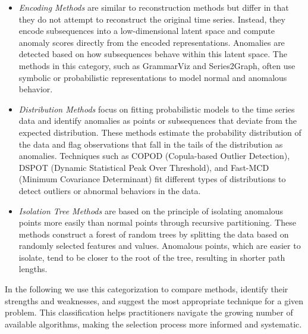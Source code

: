 \begin{itemize}
    \item \textit{Encoding Methods} are similar to reconstruction methods but differ in that they do not attempt to reconstruct the original time series. Instead, they encode subsequences into a low-dimensional latent space and compute anomaly scores directly from the encoded representations. Anomalies are detected based on how subsequences behave within this latent space. The methods in this category, such as GrammarViz and Series2Graph, often use symbolic or probabilistic representations to model normal and anomalous behavior.

    \item \textit{Distribution Methods} focus on fitting probabilistic models to the time series data and identify anomalies as points or subsequences that deviate from the expected distribution. These methods estimate the probability distribution of the data and flag observations that fall in the tails of the distribution as anomalies. Techniques such as COPOD (Copula-based Outlier Detection), DSPOT (Dynamic Statistical Peak Over Threshold), and Fast-MCD (Minimum Covariance Determinant) fit different types of distributions to detect outliers or abnormal behaviors in the data.

    \item \textit{Isolation Tree Methods} are based on the principle of isolating anomalous points more easily than normal points through recursive partitioning. These methods construct a forest of random trees by splitting the data based on randomly selected features and values. Anomalous points, which are easier to isolate, tend to be closer to the root of the tree, resulting in shorter path lengths.
\end{itemize}

In the following we use this categorization to compare methods, identify their strengths and weaknesses, and suggest the most appropriate technique for a given problem. This classification helps practitioners navigate the growing number of available algorithms, making the selection process more informed and systematic.

